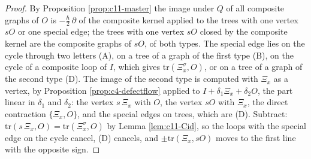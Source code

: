 \begin{proof}
By Proposition \ref{prop:c11-master} the image under $Q$ of all composite graphs of $O$ is $-\tfrac\hbar2\,\partial$ of the composite kernel applied to the trees with one vertex $sO$ or one special edge; the trees with one vertex $sO$ closed by the composite kernel are the composite graphs of $sO$, of both types. The special edge lies on the cycle through two letters (A), on a tree of a graph of the first type (B), on the cycle of a composite loop of $I$, which gives $\mathrm{tr}(\Xi^\sigma_x,O)$, or on a tree of a graph of the second type (D). The image of the second type is computed with $\Xi_x$ as a vertex, by Proposition \ref{prop:c4-defectflow} applied to $I+\delta_1\Xi_x+\delta_2O$, the part linear in $\delta_1$ and $\delta_2$: the vertex $s\,\Xi_x$ with $O$, the vertex $sO$ with $\Xi_x$, the direct contraction $\{\Xi_x,O\}$, and the special edges on trees, which are (D). Subtract: $\mathrm{tr}(s\,\Xi_x,O)=\mathrm{tr}(\Xi^\sigma_x,O)$ by Lemma \ref{lem:c11-Cid}, so the loops with the special edge on the cycle cancel, (D) cancels, and $\pm\mathrm{tr}(\Xi_x,sO)$ moves to the first line with the opposite sign.
\end{proof}

